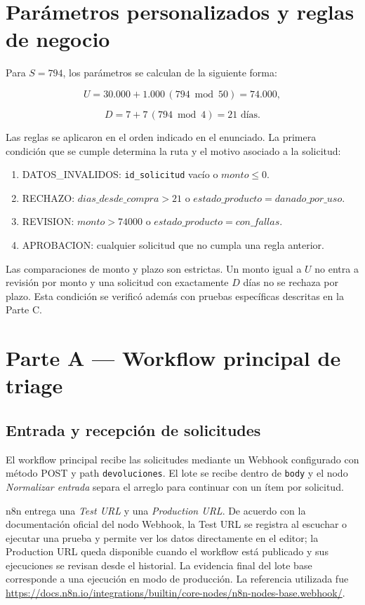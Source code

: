 \documentclass[10pt,a4paper]{article}
\begin{document}
\section{Parámetros personalizados y reglas de negocio}

Para $S=794$, los parámetros se calculan de la siguiente forma:

\[
U=30.000+1.000\,(794\bmod 50)=74.000,
\]

\[
D=7+7\,(794\bmod 4)=21\text{ días}.
\]

Las reglas se aplicaron en el orden indicado en el enunciado. La primera condición que se cumple determina la ruta y el motivo asociado a la solicitud:

\begin{enumerate}[label=\arabic*.]
    \item DATOS\_INVALIDOS: \texttt{id\_solicitud} vacío o $monto \leq 0$.
    \item RECHAZO: $dias\_desde\_compra > 21$ o $estado\_producto = danado\_por\_uso$.
    \item REVISION: $monto > 74000$ o $estado\_producto = con\_fallas$.
    \item APROBACION: cualquier solicitud que no cumpla una regla anterior.
\end{enumerate}

Las comparaciones de monto y plazo son estrictas. Un monto igual a $U$ no entra a revisión por monto y una solicitud con exactamente $D$ días no se rechaza por plazo. Esta condición se verificó además con pruebas específicas descritas en la Parte C.

\section{Parte A --- Workflow principal de triage}

\subsection{Entrada y recepción de solicitudes}

El workflow principal recibe las solicitudes mediante un Webhook configurado con método POST y path \texttt{devoluciones}. El lote se recibe dentro de \texttt{body} y el nodo \textit{Normalizar entrada} separa el arreglo para continuar con un ítem por solicitud.

n8n entrega una \textit{Test URL} y una \textit{Production URL}. De acuerdo con la documentación oficial del nodo Webhook, la Test URL se registra al escuchar o ejecutar una prueba y permite ver los datos directamente en el editor; la Production URL queda disponible cuando el workflow está publicado y sus ejecuciones se revisan desde el historial. La evidencia final del lote base corresponde a una ejecución en modo de producción. La referencia utilizada fue \url{https://docs.n8n.io/integrations/builtin/core-nodes/n8n-nodes-base.webhook/}.
\end{document}
